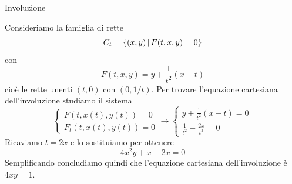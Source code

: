 \documentclass[a4paper]{article}
\begin{document}
\begin{radioactive}
\begin{snippetexample}{Involuzione}
    \begin{figure}
        \begin{center}
        \end{center}
    \end{figure}
    Consideriamo la famiglia di rette \[
        C_t = \{(x,y) \,|\, F(t, x,y) = 0\}
    \]
    con
    \[
        F(t,x,y) = y + \frac{1}{t^2}(x-t)
    \]
    cioè le rette unenti \((t,0)\) con \((0, 1/t)\).
    Per trovare l'equazione cartesiana dell'involuzione studiamo il sistema
    \[
        \begin{cases}
            F(t,x(t), y(t)) = 0 \\
            F_t(t, x(t), y(t)) = 0
        \end{cases}
        \rightarrow
        \begin{cases}
            y + \frac{1}{t^2}(x-t) = 0 \\
            \frac{1}{t^2} -\frac{2x}{t^3} = 0
        \end{cases}
    \]
    Ricaviamo \(t = 2x\) e lo sostituiamo
    per ottenere \[4x^2y + x - 2x = 0\]
    Semplificando concludiamo quindi che l'equazione cartesiana dell'involuzione è \(4xy = 1\).
    \wrapfill
\end{snippetexample}
\end{radioactive}
\end{document}

